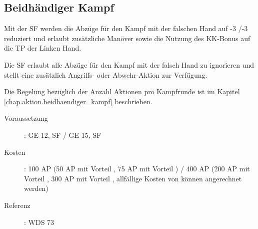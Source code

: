 \subsection{Beidhändiger Kampf}
\label{sf.beidhaendiger_kampf}
Mit der SF  werden die Abzüge für den Kampf mit der falschen Hand auf -3 /-3 reduziert und erlaubt zusätzliche Manöver sowie die Nutzung des KK-Bonus auf die TP der Linken Hand.

Die SF  erlaubt alle Abzüge für den Kampf mit der falsch Hand zu ignorieren und stellt eine zusätzlich Angriffs- oder Abwehr-Aktion zur Verfügung.

Die Regelung bezüglich der Anzahl Aktionen pro Kampfrunde ist im Kapitel \ref{chap.aktion.beidhaendiger_kampf} beschrieben.

\begin{description}
    \item[Voraussetzung]:
        GE 12, SF  / GE 15, SF 
    \item [Kosten]:
        100 AP (50 AP mit Vorteil , 75 AP mit Vorteil ) / 400 AP (200 AP mit Vorteil , 300 AP mit Vorteil , allfällige Kosten von  können angerechnet werden)
    \item [Referenz]:
        WDS 73
\end{description}
